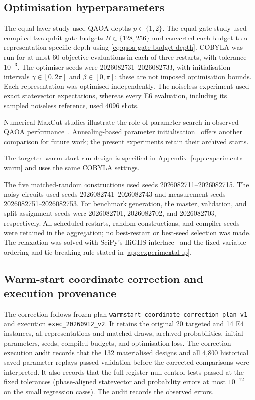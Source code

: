 \documentclass[a4paper,onecolumn,11pt,unpublished]{quantumarticle}
\theoremstyle{remark}
\begin{document}
\subsection{Optimisation hyperparameters}
\label{app:optimisation-hyperparameters}
The equal-layer study used QAOA depths $p\in\{1,2\}$.  The equal-gate study
used compiled two-qubit-gate budgets $B\in\{128,256\}$ and converted each
budget to a representation-specific depth using
\cref{eq:qaoa-gate-budget-depth}.  COBYLA was run for at most 60 objective
evaluations in each of three restarts, with tolerance $10^{-3}$.  The optimiser
seeds were 2026082731--2026082733, with
initialisation intervals $\gamma\in[0,2\pi]$ and $\beta\in[0,\pi]$;
these are not imposed optimisation bounds. Each representation was optimised
independently.  The noiseless experiment used exact statevector expectations,
whereas every E6 evaluation, including its sampled noiseless reference, used
4096 shots.

Numerical MaxCut studies illustrate the role of parameter search in
observed QAOA performance~\cite{Crooks2018,Zhou2020}. Annealing-based
parameter initialisation~\cite{Sack2021} offers another comparison
for future work; the present experiments retain their archived starts.

The targeted warm-start run design is specified in
Appendix~\ref{app:experimental-warm} and uses the same COBYLA settings.

The five matched-random constructions used seeds 2026082711--2026082715.
The noisy circuits used seeds 2026082741--2026082743 and measurement seeds
2026082751--2026082753.  For benchmark generation, the master, validation,
and split-assignment seeds were 2026082701, 2026082702, and 2026082703,
respectively.  All
scheduled restarts, random constructions, and
compiler seeds were retained in the aggregation; no best-restart or best-seed
selection was made.  The relaxation was solved with SciPy's HiGHS
interface~\cite{HuangfuHall2018}
and the fixed variable ordering and tie-breaking rule stated in
\cref{app:experimental-lp}.

\subsection{Warm-start coordinate correction and execution provenance}
\label{app:warmstart-correction-provenance}

The correction follows frozen plan
\texttt{warmstart\_coordinate\_correction\_plan\_v1} and execution
\texttt{exec\_20260912\_v2}. It retains the original 20 targeted and 14 E4
instances, all representations and matched draws, archived probabilities,
initial parameters, seeds, compiled budgets, and optimisation loss.
The correction execution audit records that the 132 materialised designs
and all 4,800 historical saved-parameter replays passed validation before
the corrected comparisons were interpreted. It also records that the
full-register null-control tests passed at the fixed tolerances
(phase-aligned statevector and probability errors at most $10^{-12}$ on
the small regression cases). The audit records the observed errors.
\end{document}
